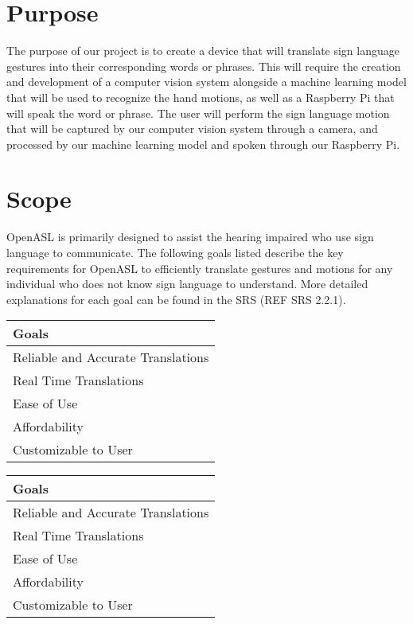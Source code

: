 \documentclass[12pt, titlepage]{article}
\begin{document}
\section{Purpose}
The purpose of our project is to create a device that will translate sign language gestures into their corresponding words 
or phrases. This will require the creation and development of a computer vision system alongside a machine learning model that 
will be used to recognize the hand motions, as well as a Raspberry Pi that will speak the word or phrase. The user will perform 
the sign language motion that will be captured by our computer vision system through a camera, and processed by our machine learning 
model and spoken through our Raspberry Pi.


\section{Scope}
OpenASL is primarily designed to assist the hearing impaired who use sign language to communicate. The following goals listed 
describe the key requirements for OpenASL to efficiently translate gestures and motions for any individual who does not know sign language 
to understand. More detailed explanations for each goal can be found in the SRS (REF SRS 2.2.1).


\begin{center}
\begin{tabular}{ | m{18em} | } 
  \hline
  Goals\\ 
  \hline
  Reliable and Accurate Translations\\ 
  \hline
  Real Time Translations\\ 
  \hline
  Ease of Use\\
  \hline
  Affordability\\
  \hline
  Customizable to User\\
  \hline
\end{tabular}
\end{center}

\begin{center}
\begin{tabular} {m{18em}}
  \toprule		
  \textbf{Goals}\\
  \midrule 
  Reliable and Accurate Translations\\
  \hline
  Real Time Translations\\ 
  \hline
  Ease of Use\\
  \hline
  Affordability\\
  \hline
  Customizable to User\\
  \bottomrule
\end{tabular}\\
\end{center}
\end{document}
